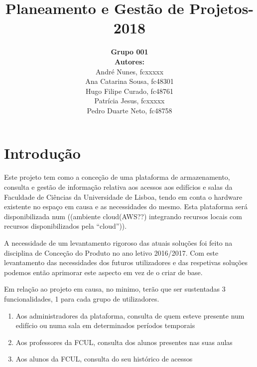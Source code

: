 \documentclass[a4paper]{report}
\begin{document}
\title{\textbf{Planeamento e Gestão de Projetos}\linebreak {}-2018\linebreak {}}
\date{}
\author{
	\textbf{Grupo 001}\\
	\textbf{Autores:}\\
	André Nunes, fcxxxxx\\
	Ana Catarina Sousa, fc48301\\ 
	Hugo Filipe Curado, fc48761\\ 
	Patrícia Jesus, fcxxxxx\\
	Pedro Duarte Neto, fc48758
}
\maketitle
\tableofcontents
\chapter{Introdução}
Este projeto tem como a conceção de uma plataforma de armazenamento, consulta e gestão de informação relativa aos acessos aos edifícios e salas da Faculdade de Ciências da Universidade de Lisboa, tendo em conta o hardware existente no espaço em causa e as necessidades do mesmo.
Esta plataforma será disponibilizada num ((ambiente cloud(AWS??) integrando recursos locais com recursos disponibilizados pela “cloud”)).

A necessidade de um levantamento rigoroso das atuais soluções foi feito na disciplina de Conceção do Produto no ano letivo 2016/2017. Com este levantamento das necessidades dos futuros utilizadores e das respetivas soluções podemos então aprimorar este aspecto em vez de o criar de base.

Em relação ao projeto em causa, no minimo, terão que ser sustentadas 3 funcionalidades, 1 para cada grupo de utilizadores.
\begin{enumerate}
\item Aos administradores da plataforma, consulta de quem esteve presente num edifício ou numa sala em determinados períodos temporais
\item Aos professores da FCUL, consulta dos alunos presentes nas suas aulas
\item Aos alunos da FCUL, consulta do seu histórico de acessos
\end{enumerate}
\end{document}
